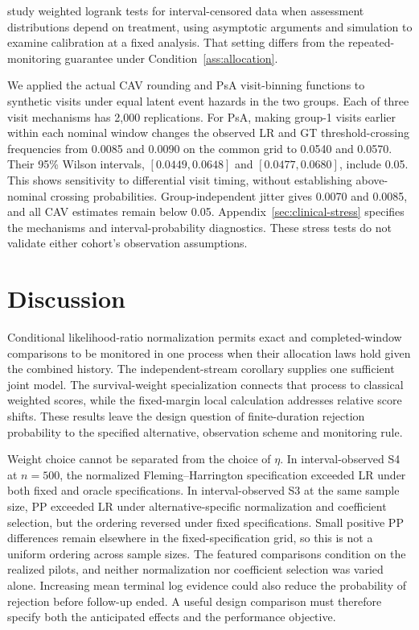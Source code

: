 \documentclass[12pt]{article}
\theoremstyle{definition}
\theoremstyle{remark}
\begin{document}
\citet{FayShih2012} study weighted logrank tests for interval-censored data when assessment distributions depend on treatment, using asymptotic arguments and simulation to examine calibration at a fixed analysis. That setting differs from the repeated-monitoring guarantee under Condition~\ref{ass:allocation}.

We applied the actual CAV rounding and PsA visit-binning functions to synthetic visits under equal latent event hazards in the two groups. Each of three visit mechanisms has 2,000 replications. For PsA, making group-1 visits earlier within each nominal window changes the observed LR and GT threshold-crossing frequencies from 0.0085 and 0.0090 on the common grid to 0.0540 and 0.0570. Their 95\% Wilson intervals, $[0.0449,0.0648]$ and $[0.0477,0.0680]$, include 0.05. This shows sensitivity to differential visit timing, without establishing above-nominal crossing probabilities. Group-independent jitter gives 0.0070 and 0.0085, and all CAV estimates remain below 0.05. Appendix~\ref{sec:clinical-stress} specifies the mechanisms and interval-probability diagnostics. These stress tests do not validate either cohort's observation assumptions.

\section{Discussion}
\label{sec:discussion}

Conditional likelihood-ratio normalization permits exact and completed-window comparisons to be monitored in one process when their allocation laws hold given the combined history. The independent-stream corollary supplies one sufficient joint model. The survival-weight specialization connects that process to classical weighted scores, while the fixed-margin local calculation addresses relative score shifts. These results leave the design question of finite-duration rejection probability to the specified alternative, observation scheme and monitoring rule.

Weight choice cannot be separated from the choice of $\eta$. In interval-observed S4 at $n=500$, the normalized Fleming--Harrington specification exceeded LR under both fixed and oracle specifications. In interval-observed S3 at the same sample size, PP exceeded LR under alternative-specific normalization and coefficient selection, but the ordering reversed under fixed specifications. Small positive PP differences remain elsewhere in the fixed-specification grid, so this is not a uniform ordering across sample sizes. The featured comparisons condition on the realized pilots, and neither normalization nor coefficient selection was varied alone. Increasing mean terminal log evidence could also reduce the probability of rejection before follow-up ended. A useful design comparison must therefore specify both the anticipated effects and the performance objective.
\end{document}
